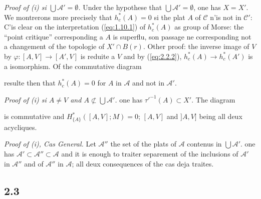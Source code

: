 \documentclass[11pt,a4paper]{article}
\theoremstyle{plain}
\theoremstyle{definition}
\newcommand{\ori}{\operatorname{or}}
\begin{document}
\noindent\textit{Proof of (i) si $\bigcup\mathcal{A}' = \emptyset$.} Under the hypothese that $\bigcup\mathcal{A}' = \emptyset$, one has $X = X'$.
We montrerons more precisely that $h^*_c(A) = 0$ si the plat $A$ of $\mathcal{C}$ n'is not in $\mathcal{C}'$: C'is clear on the interpretation (\ref{eq:1.10.1}) of $h^*_c(A)$ as group of Morse: the ``point critique'' corresponding a $A$ is superflu, son passage ne corresponding not a changement of the topologie of $X' \cap B(r)$. Other proof: the inverse image of $V$ by $\varphi: [A,V] \to [A',V]$ is reduite a $V$ and by (\ref{eq:2.2.2}), $h^*_c(A) \to h^*_c(A')$ is a isomorphism. Of the commutative diagram
resulte then that $h^*_c(A) = 0$ for $A$ in $\mathcal{A}$ and not in $\mathcal{A}'$.

\noindent\textit{Proof of (i) si $A \neq V$ and $A \not\subset \bigcup\mathcal{A}'$.} one has $\tau'^{-1}(A) \subset X'$. The diagram
is commutative and $H^*_{\{A\}}([A,V];M) = 0$; $[A,V]$ and $]A,V]$ being all deux acycliques.

\noindent\textit{Proof of (i), Cas General.} Let $\mathcal{A}''$ the set of the plats of $\mathcal{A}$ contenus in $\bigcup\mathcal{A}'$. one has $\mathcal{A}' \subset \mathcal{A}'' \subset \mathcal{A}$ and it is enough to traiter separement of the inclusions of $\mathcal{A}'$ in $\mathcal{A}''$ and of $\mathcal{A}''$ in $\mathcal{A}$; all deux consequences of the cas deja traites.

\subsection{2.3}\label{subsec:2.3}
\end{document}
